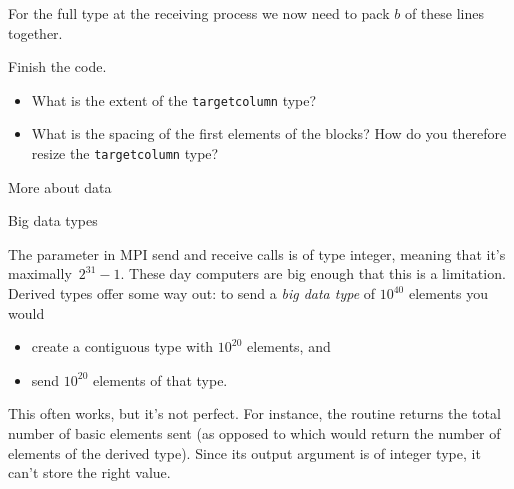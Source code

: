 For the full type at the receiving process we now need to pack
$b$ of these lines together.

\begin{exercise}
  Finish the code.
  \begin{itemize}
  \item
    What is the extent of the \lstinline{targetcolumn} type?
  \item What is the spacing of the first elements of the blocks? How
    do you therefore resize the \lstinline{targetcolumn} type?
  \end{itemize}
\end{exercise}


 {More about data}

\begin{comment}
  \Level 1 {Datatype signatures}
  \label{sec:signature}
  \index{datatype!signature|(}

  With the primitive types it pretty much went
  without saying that if the sender sends an array of doubles, the
  receiver had to declare the datatype also as doubles. With derived
  types that is no longer the case: the sender and receiver can declare
  a different datatype for the send and receive buffer, as long as these
  have the same \indextermbus{datatype}{signature}.

  The signature of a datatype is the internal representation of that
  datatype. For instance, if the sender declares a datatype consisting
  of two doubles, and it sends four elements of that type, the receiver
  can receive it as two elements of a type consisting of four doubles.

  You can also look at the signature as the form `under the hood' in which MPI
  sends the data.

  \index{datatype!signature|)}
\end{comment}

 {Big data types}

The  parameter in MPI send and receive calls is of type integer,
meaning that it's maximally~$2^{31}-1$. These day computers are big enough
that this is a limitation. Derived types offer some way out: to send
a \emph{big data type} of $10^{40}$ elements you would
\begin{itemize}
\item create a contiguous type with $10^{20}$ elements, and
\item send $10^{20}$ elements of that type.
\end{itemize}
This often works, but it's not perfect. For instance, the routine
 returns the total number of basic elements sent
(as opposed to  which would return the number
of elements of the derived type). Since its output argument is
of integer type, it can't store the right value.

